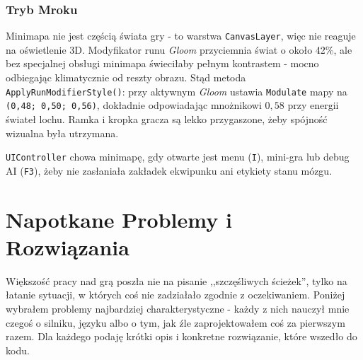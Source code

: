 \subsubsection{Tryb Mroku}

Minimapa nie jest częścią świata gry - to warstwa \texttt{CanvasLayer}, więc nie reaguje na oświetlenie 3D. Modyfikator runu \textit{Gloom} przyciemnia świat o około 42\%, ale bez specjalnej obsługi minimapa świeciłaby pełnym kontrastem - mocno odbiegając klimatycznie od reszty obrazu. Stąd metoda \texttt{ApplyRunModifierStyle()}: przy aktywnym \textit{Gloom} ustawia \texttt{Modulate} mapy na \texttt{(0,48; 0,50; 0,56)}, dokładnie odpowiadając mnożnikowi $0,58$ przy energii świateł lochu. Ramka i kropka gracza są lekko przygaszone, żeby spójność wizualna była utrzymana.

\texttt{UIController} chowa minimapę, gdy otwarte jest menu (\texttt{I}), mini-gra lub debug AI (\texttt{F3}), żeby nie zasłaniała zakładek ekwipunku ani etykiety stanu mózgu.

\section{Napotkane Problemy i Rozwiązania}

Większość pracy nad grą poszła nie na pisanie ,,szczęśliwych ścieżek'', tylko na łatanie sytuacji, w których coś nie zadziałało zgodnie z oczekiwaniem. Poniżej wybrałem problemy najbardziej charakterystyczne - każdy z nich nauczył mnie czegoś o silniku, języku albo o tym, jak źle zaprojektowałem coś za pierwszym razem. Dla każdego podaję krótki opis i konkretne rozwiązanie, które wszedło do kodu.

